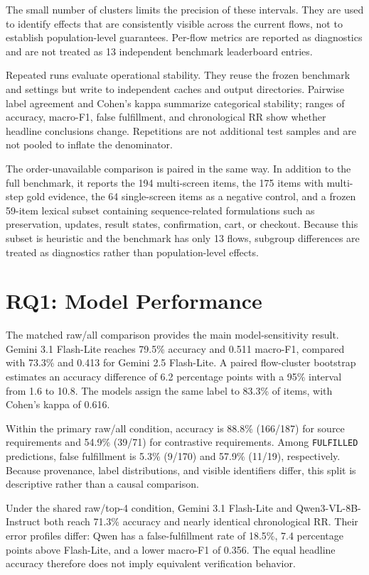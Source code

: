 The small number of clusters limits the precision of these intervals. They are
used to identify effects that are consistently visible across the current
flows, not to establish population-level guarantees. Per-flow metrics are
reported as diagnostics and are not treated as 13 independent benchmark
leaderboard entries.

Repeated runs evaluate operational stability. They reuse the frozen benchmark
and settings but write to independent caches and output directories. Pairwise
label agreement and Cohen's kappa summarize categorical stability; ranges of
accuracy, macro-F1, false fulfillment, and chronological RR show whether headline
conclusions change. Repetitions are not additional test samples and are not
pooled to inflate the denominator.

The order-unavailable comparison is paired in the same way. In addition to the
full benchmark, it reports the 194 multi-screen items, the 175 items with
multi-step gold evidence, the 64 single-screen items as a negative control, and
a frozen 59-item lexical subset containing sequence-related formulations such as
preservation, updates, result states, confirmation, cart, or checkout. Because
this subset is heuristic and the benchmark has only 13 flows, subgroup
differences are treated as diagnostics rather than population-level effects.

\section{RQ1: Model Performance}\label{rq1-model-performance}

The matched raw/all comparison provides the main model-sensitivity result.
Gemini 3.1 Flash-Lite reaches 79.5\% accuracy and 0.511 macro-F1, compared with
73.3\% and 0.413 for Gemini 2.5 Flash-Lite. A paired flow-cluster bootstrap
estimates an accuracy difference of 6.2 percentage points with a 95\% interval
from 1.6 to 10.8. The models assign the same label to 83.3\% of items, with
Cohen's kappa of 0.616.

Within the primary raw/all condition, accuracy is 88.8\% (166/187) for source
requirements and 54.9\% (39/71) for contrastive requirements. Among \texttt{FULFILLED}
predictions, false fulfillment is 5.3\% (9/170) and 57.9\% (11/19), respectively.
Because provenance, label distributions, and visible identifiers differ, this
split is descriptive rather than a causal comparison.

Under the shared raw/top-4 condition, Gemini 3.1 Flash-Lite and
Qwen3-VL-8B-Instruct both reach 71.3\% accuracy and nearly identical
chronological RR. Their error profiles differ: Qwen has a false-fulfillment rate of 18.5\%,
7.4 percentage points above Flash-Lite, and a lower macro-F1 of 0.356. The
equal headline accuracy therefore does not imply equivalent verification
behavior.

